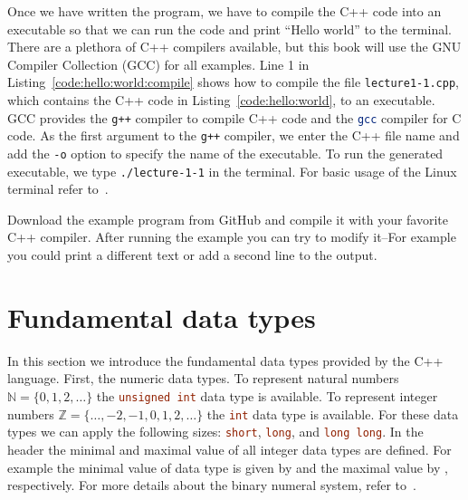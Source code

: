 Once we have written the program, we have to compile the C++ code into an executable so that we can run the code and print ``Hello world'' to the terminal. There are a plethora of C++ compilers available, but this book will use the GNU Compiler Collection (GCC) for all examples. Line 1 in Listing~\ref{code:hello:world:compile} shows how to compile the file \lstinline[language=bash]|lecture1-1.cpp|, which contains the C++ code in Listing~\ref{code:hello:world}, to an executable. GCC provides the \lstinline[language=bash]{g++} compiler to compile C++ code and the \lstinline[language=bash]{gcc} compiler for C code. As the first argument to the \lstinline[language=bash]{g++} compiler, we enter the C++ file name and add the \lstinline[language=bash]|-o| option to specify the name of the executable. To run the generated executable, we type \lstinline[language=bash]|./lecture-1-1| in the terminal. For basic usage of the Linux terminal refer to~\cite{newham2005learning,robbins2016bash}.



\begin{exercise}
Download the example program from GitHub and compile it with your favorite C++ compiler. After running the example you can try to modify it--For example you could print a different text or add a second line to the output.
\end{exercise}


\section{Fundamental data types}
\label{sec:fundamental:types}
In this section we introduce the fundamental data types provided by the C++ language. First, the numeric data types. To represent natural numbers $\mathbb{N}=\{0,1,2,\ldots \}$ the \lstinline[language=C++]|unsigned int| data type is available. To represent integer numbers $\mathbb{Z}=\{\ldots,-2,-1,0,1,2,\ldots \}$ the \lstinline[language=C++]|int| data type is available. For these data types we can apply the following sizes: \lstinline[language=C++]|short|, \lstinline[language=C++]|long|, and \lstinline[language=C++]|long long|. In the  header the minimal and maximal value of all integer data types are defined. For example the minimal value of  data type is given by  and the maximal value by , respectively. For more details about the binary numeral system, refer to~\cite{gilli1965binary}. 

